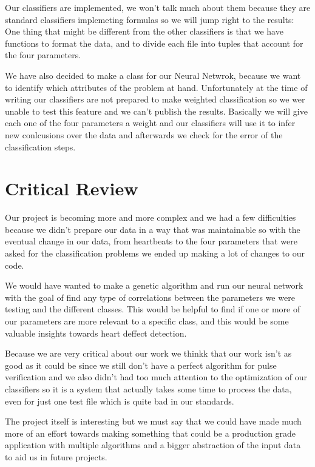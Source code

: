 \documentclass[conference]{IEEEtran}
\begin{document}
\begin{itemize}
\begin{itemize}
Our classifiers are implemented, we won't talk much about them because they are
standard classifiers implemeting formulas so we will jump right to the results:
One thing that might be different from the other classifiers is that we have
functions to format the data, and to divide each file into tuples that account
for the four parameters.

We have also decided to make a class for our Neural Netwrok, because we want to
identify which attributes of the problem at hand. Unfortunately at the time of
writing our classifiers are not prepared to make weighted classification so we
wer unable to test this feature and we can't publish the results.
Basically we will give each one of the four parameters a weight and our
classifiers will use it to infer new conlcusions over the data and afterwards
we check for the error of the classification steps.

\section{Critical Review}
Our project is becoming more and more complex and we had a few difficulties
because we didn't prepare our data in a way that was maintainable so with the
eventual change in our data, from heartbeats to the four parameters that were
asked for the classification problems we ended up making a lot of changes to our
code.

We would have wanted to make a genetic algorithm and run our neural network with
the goal of find any type of correlations between the parameters we were testing
and the different classes. This would be helpful to find if one or more of our
parameters are more relevant to a specific class, and this would be some
valuable insights towards heart deffect detection.

Because we are very critical about our work we thinkk that our work isn't as
good as it could be since we still don't have a perfect algorithm for pulse
verification and we also didn't had too much attention to the optimization of
our classifiers so it is a system that actually takes some time to process the
data, even for just one test file which is quite bad in our standards.

The project itself is interesting but we must say that we could have made much
more of an effort towards making something that could be a production grade
application with multiple algorithms and a bigger abstraction of the input data
to aid us in future projects.


\end{itemize}
\end{itemize}
\end{document}
